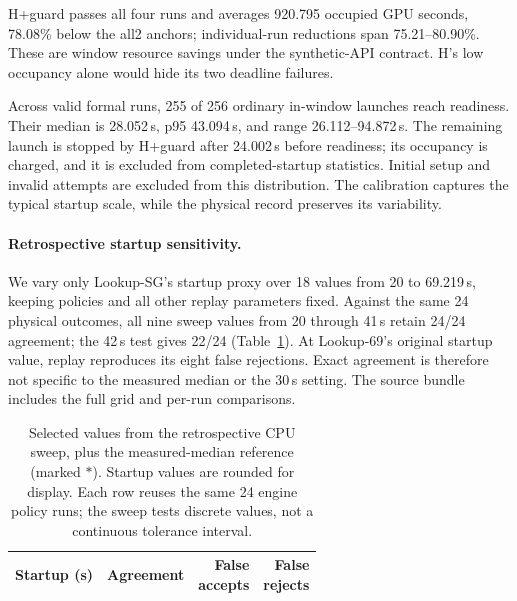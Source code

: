 H+guard passes all four runs and averages 920.795 occupied GPU seconds,
78.08\% below the all2 anchors; individual-run reductions span
75.21--80.90\%. These are window resource savings under the synthetic-API
contract. H's low occupancy alone would hide its two deadline failures.

Across valid formal runs, 255 of 256 ordinary in-window launches reach
readiness. Their median is 28.052\,s, p95 43.094\,s, and range
26.112--94.872\,s. The remaining launch is stopped by H+guard after
24.002\,s before readiness; its occupancy is charged, and it is excluded
from completed-startup statistics. Initial setup and invalid attempts
are excluded from this distribution. The calibration captures the typical
startup scale, while the physical record preserves its variability.

\paragraph{Retrospective startup sensitivity.}
We vary only Lookup-SG's startup proxy over 18 values from 20 to
69.219\,s, keeping policies and all other replay parameters fixed.
Against the same 24 physical outcomes, all nine sweep values from
20 through 41\,s retain 24/24 agreement; the 42\,s test gives 22/24
(Table~\ref{tab:e4sensitivity}). At Lookup-69's original startup value, replay
reproduces its eight false rejections. Exact agreement is therefore
not specific to the measured median or the 30\,s setting.
The source bundle includes the full grid and per-run comparisons.

\begin{table}[t]
\centering
\small
\caption{Selected values from the retrospective CPU sweep, plus the
measured-median reference (marked $*$). Startup values are rounded for
display. Each row reuses the same 24 engine policy runs; the sweep tests
discrete values, not a continuous tolerance interval.}
\label{tab:e4sensitivity}
\setlength{\tabcolsep}{3pt}
\par\vspace{4pt}
\begin{tabular*}{\linewidth}{@{\extracolsep{\fill}}rrrr@{}}
\toprule
Startup (s) & Agreement & \shortstack{False\\accepts} & \shortstack{False\\rejects}\\
\midrule

\end{tabular*}
\end{table}

